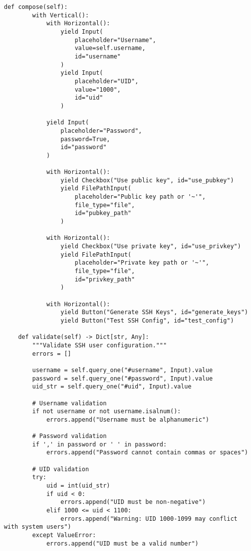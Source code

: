 \documentclass[11pt,a4paper]{article}
\begin{document}
\begin{lstlisting}[caption={ValidatedInput Implementation}]
    def compose(self):
        with Vertical():
            with Horizontal():
                yield Input(
                    placeholder="Username", 
                    value=self.username,
                    id="username"
                )
                yield Input(
                    placeholder="UID", 
                    value="1000",
                    id="uid"
                )
            
            yield Input(
                placeholder="Password",
                password=True,
                id="password"
            )
            
            with Horizontal():
                yield Checkbox("Use public key", id="use_pubkey")
                yield FilePathInput(
                    placeholder="Public key path or '~'",
                    file_type="file",
                    id="pubkey_path"
                )
                
            with Horizontal():
                yield Checkbox("Use private key", id="use_privkey")
                yield FilePathInput(
                    placeholder="Private key path or '~'",
                    file_type="file", 
                    id="privkey_path"
                )
                
            with Horizontal():
                yield Button("Generate SSH Keys", id="generate_keys")
                yield Button("Test SSH Config", id="test_config")
                
    def validate(self) -> Dict[str, Any]:
        """Validate SSH user configuration."""
        errors = []
        
        username = self.query_one("#username", Input).value
        password = self.query_one("#password", Input).value
        uid_str = self.query_one("#uid", Input).value
        
        # Username validation
        if not username or not username.isalnum():
            errors.append("Username must be alphanumeric")
            
        # Password validation
        if ',' in password or ' ' in password:
            errors.append("Password cannot contain commas or spaces")
            
        # UID validation
        try:
            uid = int(uid_str)
            if uid < 0:
                errors.append("UID must be non-negative")
            elif 1000 <= uid < 1100:
                errors.append("Warning: UID 1000-1099 may conflict with system users")
        except ValueError:
            errors.append("UID must be a valid number")
            

\end{lstlisting}
\end{document}
